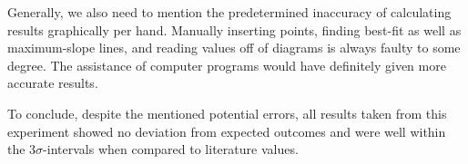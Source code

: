 \documentclass{article}
\begin{document}
Generally, we also need to mention the predetermined inaccuracy of calculating results graphically per hand. Manually inserting points, finding best-fit as well as maximum-slope lines, and reading values off of diagrams is always faulty to some degree. The assistance of computer programs would have definitely given more accurate results. 

To conclude, despite the mentioned potential errors, all results taken from this experiment showed no deviation from expected outcomes and were well within the 3$\sigma$-intervals when compared to literature values.
\end{document}
